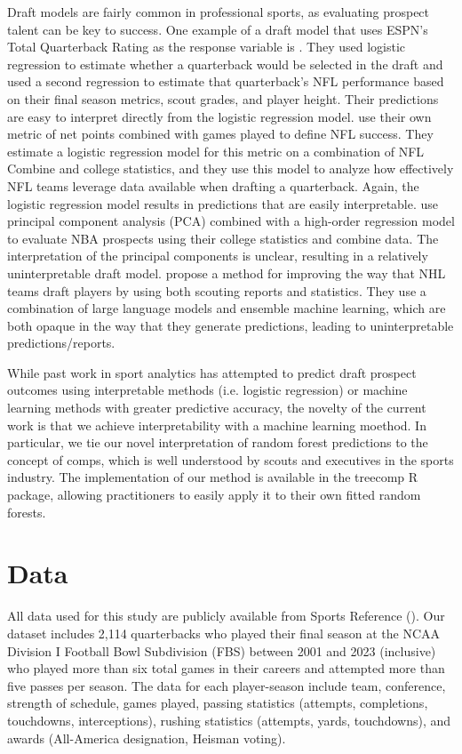\documentclass[Review, sageh, times]{sagej}
\begin{document}
Draft models are fairly common in professional sports, as evaluating prospect talent can be key to success. One example of a draft model that uses ESPN's Total Quarterback Rating as the response variable is \textcite{craig_predicting_2021}. They used logistic regression to estimate whether a quarterback would be selected in the draft and used a second regression to estimate that quarterback's NFL performance based on their final season metrics, scout grades, and player height. Their predictions are easy to interpret directly from the logistic regression model. \textcite{wolfson_quarterback_2011} use their own metric of net points combined with games played to define NFL success. They estimate a logistic regression model for this metric on a combination of NFL Combine and college statistics, and they use this model to analyze how effectively NFL teams leverage data available when drafting a quarterback. Again, the logistic regression model results in predictions that are easily interpretable. \textcite{berger_jumping_2021} use principal component analysis (PCA) combined with a high-order regression model to evaluate NBA prospects using their college statistics and combine data. The interpretation of the principal components is unclear, resulting in a relatively uninterpretable draft model. \textcite{luo_improving_2024} propose a method for improving the way that NHL teams draft players by using both scouting reports and statistics. They use a combination of large language models and ensemble machine learning, which are both opaque in the way that they generate predictions, leading to uninterpretable predictions/reports.

While past work in sport analytics has attempted to predict draft prospect outcomes using interpretable methods (i.e. logistic regression) or machine learning methods with greater predictive accuracy, the novelty of the current work is that we achieve interpretability with a machine learning moethod. In particular, we tie our novel interpretation of random forest predictions to the concept of comps, which is well understood by scouts and executives in the sports industry. The implementation of our method is available in the treecomp R package, allowing practitioners to easily apply it to their own fitted random forests.

\section{Data}
\label{sec:data}
All data used for this study are publicly available from Sports Reference (\cite{sports_reference_sports_2025}). Our dataset includes 2,114 quarterbacks who played their final season at the NCAA Division I Football Bowl Subdivision (FBS) between 2001 and 2023 (inclusive) who played more than six total games in their careers and attempted more than five passes per season. The data for each player-season include team, conference, strength of schedule, games played, passing statistics (attempts, completions, touchdowns, interceptions), rushing statistics (attempts, yards, touchdowns), and awards (All-America designation, Heisman voting).
\end{document}
